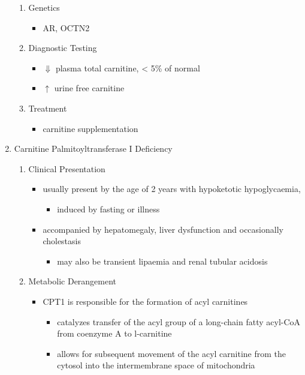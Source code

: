 \documentclass{scrartcl}
\begin{document}
\begin{enumerate}
\begin{enumerate}
\item Genetics
\label{sec:org560a36b}
\begin{itemize}
\item AR, OCTN2
\end{itemize}
\item Diagnostic Testing
\label{sec:orgcb49d39}
\begin{itemize}
\item \(\Downarrow\) plasma total carnitine, \textless{} 5\% of normal
\item \(\uparrow\) urine free carnitine
\end{itemize}
\item Treatment
\label{sec:orgd3fc637}
\begin{itemize}
\item carnitine supplementation
\end{itemize}
\end{enumerate}
\item Carnitine Palmitoyltransferase I Deficiency
\label{sec:org5b5a8fe}
\begin{enumerate}
\item Clinical Presentation
\label{sec:orgd876749}
\begin{itemize}
\item usually present by the age of 2 years with hypoketotic hypoglycaemia,
\begin{itemize}
\item induced by fasting or illness
\end{itemize}
\item accompanied by hepatomegaly, liver dysfunction and occasionally cholestasis
\begin{itemize}
\item may also be transient lipaemia and renal tubular acidosis
\end{itemize}
\end{itemize}
\item Metabolic Derangement
\label{sec:orge7faf21}
\begin{itemize}
\item CPT1 is responsible for the formation of acyl carnitines
\begin{itemize}
\item catalyzes transfer of the acyl group of a long-chain fatty
acyl-CoA from coenzyme A to l-carnitine
\item allows for subsequent movement of the acyl carnitine from the
cytosol into the intermembrane space of mitochondria
\end{itemize}

\end{itemize}
\end{enumerate}
\end{enumerate}
\end{document}
